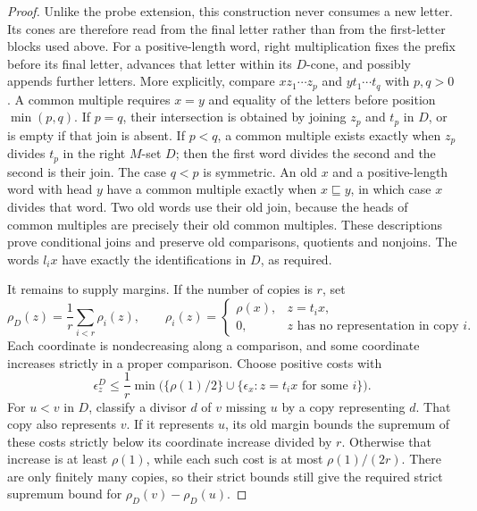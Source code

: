 \begin{proof}
Unlike the probe extension, this construction never consumes a new
letter.  Its cones are therefore read from the final letter rather
than from the first-letter blocks used above.  For a positive-length
word, right multiplication fixes the prefix before its final letter,
advances that letter within its $D$-cone, and possibly appends further
letters.  More explicitly, compare
$xz_1\cdots z_p$ and $yt_1\cdots t_q$ with $p,q>0$.
A common multiple requires $x=y$ and equality of the letters before
position $\min(p,q)$.  If $p=q$, their intersection is obtained by
joining $z_p$ and $t_p$ in $D$, or is empty if that join is absent.
If $p<q$, a common multiple exists exactly when $z_p$ divides $t_p$
in the right $M$-set $D$; then the first word divides the second and
the second is their join.  The case $q<p$ is symmetric.
An old $x$ and a positive-length word with head $y$ have a common
multiple exactly when $x\sqsubseteq y$, in which case $x$ divides
that word.  Two old words use their old join, because the heads of
common multiples are precisely their old common multiples.
These descriptions prove conditional joins and preserve old comparisons,
quotients and nonjoins.  The words $l_i x$ have exactly the
identifications in $D$, as required.

It remains to supply margins.  If the number of copies is $r$, set
\[
 \rho_D(z)=\frac1r\sum_{i<r}\rho_i(z),\qquad
 \rho_i(z)=
 \begin{cases}
 \rho(x),&z=t_i x,\\
 0,&z\text{ has no representation in copy }i.
 \end{cases}
\]
Each coordinate is nondecreasing along a comparison, and some
coordinate increases strictly in a proper comparison.  Choose positive
costs with
\[
 \epsilon^D_z\leq\frac1r
 \min\bigl(\{\rho(1)/2\}\cup
           \{\epsilon_x:z=t_i x\text{ for some }i\}\bigr).
\]
For $u<v$ in $D$, classify a divisor $d$ of $v$ missing $u$ by a
copy representing $d$.  That copy also represents $v$.  If it
represents $u$, its old margin bounds the supremum of these costs
strictly below its coordinate increase divided by $r$.  Otherwise
that increase is at least $\rho(1)$, while each such cost is at most
$\rho(1)/(2r)$.  There are only finitely many copies, so their strict
bounds still give the required strict supremum bound for
$\rho_D(v)-\rho_D(u)$.


\end{proof}
